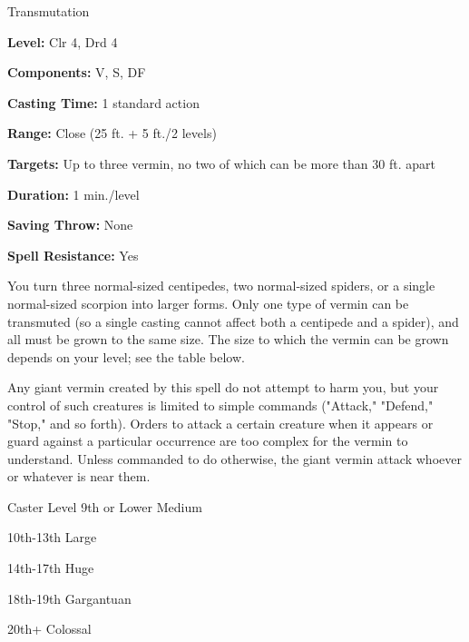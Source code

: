 
Transmutation

\textbf{Level:} Clr 4, Drd 4

\textbf{Components:} V, S, DF

\textbf{Casting Time:} 1 standard action

\textbf{Range:} Close (25 ft. + 5 ft./2 levels)

\textbf{Targets:} Up to three vermin, no two of which can be more than 30 ft. apart

\textbf{Duration:} 1 min./level

\textbf{Saving Throw:} None

\textbf{Spell Resistance:} Yes

You turn three normal-sized centipedes, two normal-sized spiders, or a single normal-sized 
scorpion into larger forms. Only one type of vermin can be transmuted (so a single 
casting cannot affect both a centipede and a spider), and all must be grown to 
the same size. The size to which the vermin can be grown depends on your level; 
see the table below.

Any giant vermin created by this spell do not attempt to harm you, but your control 
of such creatures is limited to simple commands ("Attack," "Defend," "Stop," 
and so forth). Orders to attack a certain creature when it appears or guard against 
a particular occurrence are too complex for the vermin to understand. Unless commanded 
to do otherwise, the giant vermin attack whoever or whatever is near them.

\begin{description*}
\item[Caster Level 9th or Lower] Medium
\item[10th-13th] Large
\item[14th-17th] Huge
\item[18th-19th] Gargantuan
\item[20th+] Colossal
\end{description*}
